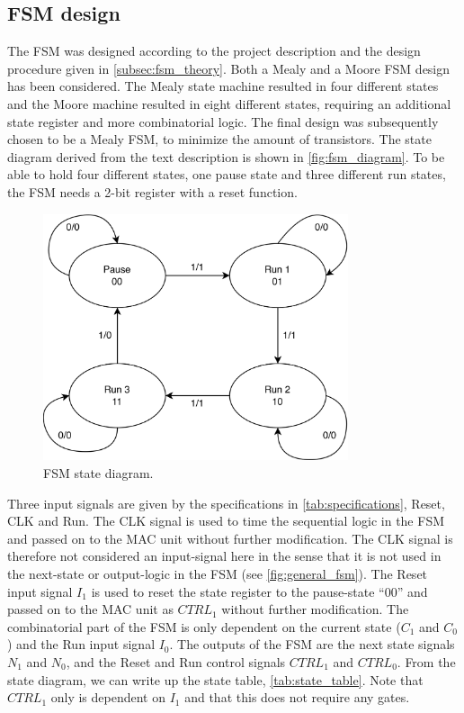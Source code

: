 \subsection{FSM design}

The FSM was designed according to the project description and the design procedure given in \autoref{subsec:fsm_theory}. Both a Mealy and a Moore FSM design has been considered. The Mealy state machine resulted in four different states and the Moore machine resulted in eight different states, requiring an additional state register and more combinatorial logic. The final design was subsequently chosen to be a Mealy FSM, to minimize the amount of transistors. The state diagram derived from the text description is shown in \autoref{fig:fsm_diagram}. To be able to hold four different states, one pause state and three different run states, the FSM needs a 2-bit register with a reset function. 

\begin{figure}[H]
    \centering
    \includegraphics[width=0.8\textwidth]{Figures/FSM-diagram.png}
    \caption{FSM state diagram.}
    \label{fig:fsm_diagram}
\end{figure}

Three input signals are given by the specifications in \autoref{tab:specifications}, Reset, CLK and Run. The CLK signal is used to time the sequential logic in the FSM and passed on to the MAC unit without further modification. The CLK signal is therefore not considered an input-signal here in the sense that it is not used in the next-state or output-logic in the FSM (see \autoref{fig:general_fsm}). The Reset input signal $I_1$ is used to reset the state register to the pause-state ``00'' and passed on to the MAC unit as $CTRL_1$ without further modification. The combinatorial part of the FSM is only dependent on the current state ($C_1$ and $C_0$) and the Run input signal $I_0$. The outputs of the FSM are the next state signals $N_1$ and $N_0$, and the Reset and Run control signals $CTRL_1$ and $CTRL_0$. From the state diagram, we can write up the state table, \autoref{tab:state_table}. Note that $CTRL_1$ only is dependent on $I_1$ and that this does not require any gates.

